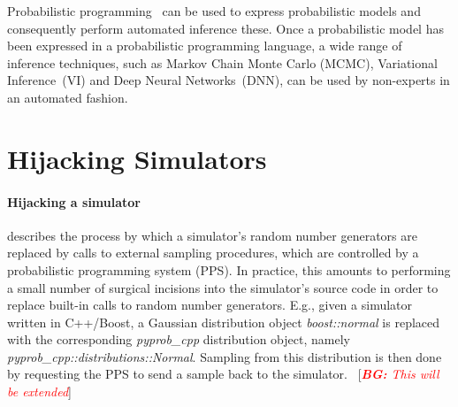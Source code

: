 \documentclass{article}
\newcommand{\bg}[1]{~{{[{\it \textcolor{red}{{\bf BG:} #1}}]}}}
\begin{document}
Probabilistic programming~\cite{gordon2014probabilistic,staton2016semantics,kozen1979semantics} 
can be used to express probabilistic models and consequently perform automated inference these. Once a probabilistic model has been expressed in a probabilistic programming language, a wide range of inference techniques, such as Markov Chain Monte Carlo (MCMC)\cite{}, Variational Inference~(VI)\cite{} and Deep Neural Networks~(DNN)\cite{},  can be used by non-experts in an automated fashion. 
 







\section{Hijacking Simulators}

\paragraph{Hijacking a simulator} describes the process by which a simulator's random number generators are replaced by calls to external sampling procedures, which are controlled by a probabilistic programming system (PPS). In practice, this amounts to performing a small number of surgical incisions into the simulator's source code in order to replace built-in calls to random number generators. E.g., given a simulator written in C++/Boost\cite{schaling2011boost}, a Gaussian distribution object \textit{boost::normal} is replaced with the corresponding \textit{pyprob\_cpp} distribution object, namely \textit{pyprob\_cpp::distributions::Normal}. Sampling from this distribution is then done by requesting the PPS to send a sample back to the simulator. \bg{This will be extended}
\end{document}
